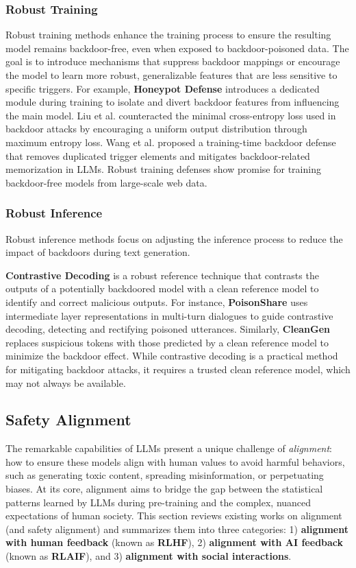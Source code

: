 \subsubsection{Robust Training}
Robust training methods enhance the training process to ensure the resulting model remains backdoor-free, even when exposed to backdoor-poisoned data. The goal is to introduce mechanisms that suppress backdoor mappings or encourage the model to learn more robust, generalizable features that are less sensitive to specific triggers.
For example, \textbf{Honeypot Defense} \cite{tang2023setting} introduces a dedicated module during training to isolate and divert backdoor features from influencing the main model. Liu et al. \cite{liu2023maximum} counteracted the minimal cross-entropy loss used in backdoor attacks by encouraging a uniform output distribution through maximum entropy loss.
Wang et al. \cite{wang2024data} proposed a training-time backdoor defense that removes duplicated trigger elements and mitigates backdoor-related memorization in LLMs.
Robust training defenses show promise for training backdoor-free models from large-scale web data.


\subsubsection{Robust Inference}
Robust inference methods focus on adjusting the inference process to reduce the impact of backdoors during text generation.

\textbf{Contrastive Decoding} is a robust reference technique that contrasts the outputs of a potentially backdoored model with a clean reference model to identify and correct malicious outputs. 
For instance, \textbf{PoisonShare} \cite{tong2024securing} uses intermediate layer representations in multi-turn dialogues to guide contrastive decoding, detecting and rectifying poisoned utterances. Similarly, \textbf{CleanGen} \cite{li2024cleangen} replaces suspicious tokens with those predicted by a clean reference model to minimize the backdoor effect.
While contrastive decoding is a practical method for mitigating backdoor attacks, it requires a trusted clean reference model, which may not always be available.

\subsection{Safety Alignment}
\label{sec:llm_safety alignment}

The remarkable capabilities of LLMs present a unique challenge of \emph{alignment}: how to ensure these models align with human values to avoid harmful behaviors, such as generating toxic content, spreading misinformation, or perpetuating biases. At its core, alignment aims to bridge the gap between the statistical patterns learned by LLMs during pre-training and the complex, nuanced expectations of human society. 
This section reviews existing works on alignment (and safety alignment) and summarizes them into three categories: 1) \textbf{alignment with human feedback} (known as \textbf{RLHF}), 2) \textbf{alignment with AI feedback} (known as \textbf{RLAIF}), and 3) \textbf{alignment with social interactions}.

